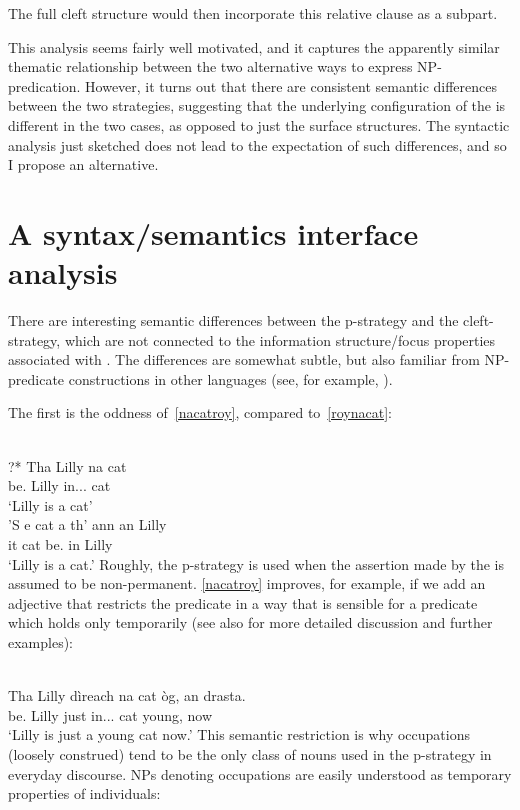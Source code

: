 \documentclass[output=paper]{langsci/langscibook}
\begin{document}
The full cleft structure would then incorporate this relative clause as a subpart.

This analysis seems fairly well motivated, and it captures the apparently
similar thematic relationship between the two alternative ways to express
NP-pred\-i\-ca\-tion.  However,  it turns out that there are consistent
semantic differences between the two strategies, suggesting that the underlying
configuration of the  is different in the two cases, as opposed to
just the surface structures. The syntactic analysis just sketched does not lead
to the expectation of such differences, and so I propose an alternative.

\section{A syntax/semantics interface analysis}

There are interesting semantic differences between the p-strategy and the
cleft-strategy, which are not connected to the information structure/focus
properties associated with . The differences are somewhat subtle, but
also familiar from NP-predicate constructions in other languages (see, for
example, \citealt{roy:06}).

The first is the oddness of~\eqref{nacatroy}, compared to~\eqref{roynacat}:

\ea {}\\
\gll ?* Tha Lilly na cat\\
    {}  be.\Prs{} Lilly in.\Poss.\Tsg.\glossF{} cat\\
\glt {} \enquote*{Lilly is a cat}\label{nacatroy}
\ex {} \label{roynacat}\\
\gll 'S e cat a th' {ann an} Lilly\\
\Cop{} it cat \Rel{} be.\Prs{} in Lilly\\
\glt \enquote*{Lilly is a cat.}
\z
Roughly, the p-strategy is used when the assertion made by the  is
assumed to be non-permanent. \eqref{nacatroy} improves, for example, if we add an
adjective that restricts the predicate in a way that is sensible for a predicate
which holds only temporarily (see also \citealt{schreiner:15} for more detailed
discussion and further examples):

\ea {}\\
 \gll Tha Lilly d\`ireach na cat \`og, an drasta.\\
be.\Prs{} Lilly just in.\Poss.\Tsg.\glossF{} cat young, now\\
\glt \enquote*{Lilly is just a young cat now.}
\z
This semantic restriction is why occupations (loosely construed) tend to be the
only class of nouns used in the p-strategy in everyday discourse. NPs denoting
occupations are easily understood as temporary properties of
individuals:
\end{document}

